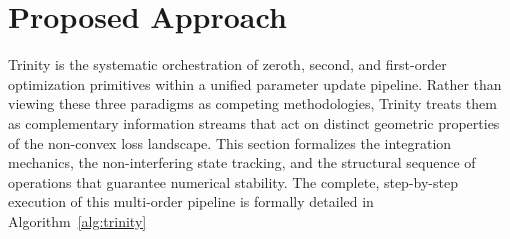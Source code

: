 \documentclass[conference]{IEEEtran}
\begin{document}





\section{Proposed Approach}
\label{sec:proposed_method}

Trinity is the systematic orchestration of zeroth, second, and first-order optimization primitives within a unified parameter update pipeline. Rather than viewing these three paradigms as competing methodologies, Trinity treats them as complementary information streams that act on distinct geometric properties of the non-convex loss landscape. This section formalizes the integration mechanics, the non-interfering state tracking, and the structural sequence of operations that guarantee numerical stability. The complete, step-by-step execution of this multi-order pipeline is formally detailed in Algorithm~\ref{alg:trinity}
\end{document}
